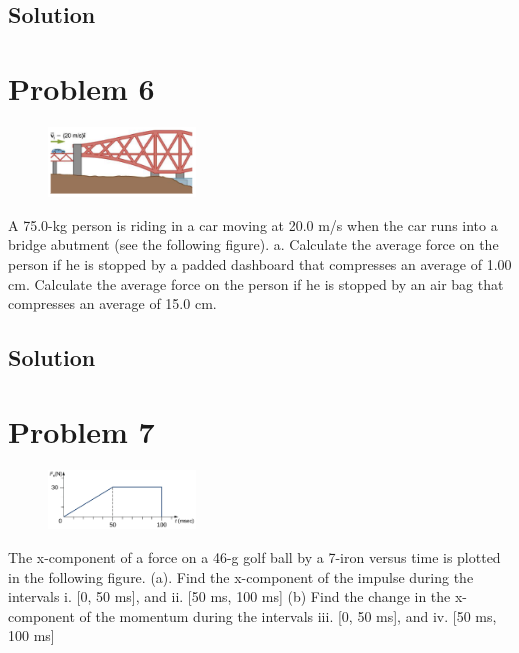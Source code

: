 \documentclass[12pt]{article}
\begin{document}
\subsection*{Solution}


\pagebreak
\section*{Problem 6}
\begin{figure}
    \vspace{-30pt}
    \includegraphics[width=0.35\textwidth]{graph_6.png} 
\end{figure}
A 75.0-kg person is riding in a car moving at 20.0 m/s when the car runs into a bridge abutment
(see the following figure). a. Calculate the average force on the person if he is stopped by a padded
dashboard that compresses an average of 1.00 cm. Calculate the average force on the person if he is
stopped by an air bag that compresses an average of 15.0 cm.

\subsection*{Solution}


\pagebreak
\section*{Problem 7}
\begin{figure}
    \vspace{-30pt}
    \includegraphics[width=0.35\textwidth]{graph_7.png} 
\end{figure}
The x-component of a force on a 46-g golf ball by a 7-iron versus time is plotted in the following
figure. (a). Find the x-component of the impulse during the intervals i. [0, 50 ms], and ii. [50 ms, 100 ms]
(b) Find the change in the x-component of the momentum during the intervals iii. [0, 50 ms], and iv. [50
ms, 100 ms]
\end{document}
